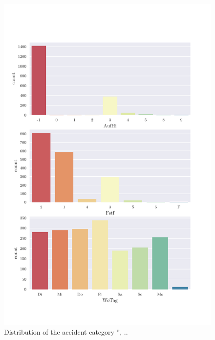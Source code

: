 \documentclass[a4paper,headsepline,footsepline,fontsize=11pt,BCOR=12mm,DIV=12]{report}
\begin{document}
\begin{appendices}
\begin{figure}[h]
	\centering
	\includegraphics[scale=0.7]{../CorrAnalysis/data/BAYSIS/03_selected_01_startJam/plots/baysis_selected_count_multiple02}
	\caption{Distribution of the accident category '', ..}
	\label{img:appendix_baysis_selected_01_02}
\end{figure}


\end{appendices}
\end{document}
